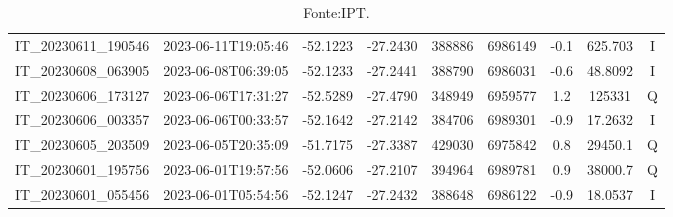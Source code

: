 \begin{table}[htb!]
\begin{center}
{\begin{tabular}{ccccS[table-format=6.0]S[table-format=7.0]ccc}
                IT\_20230611\_190546 & 2023-06-11T19:05:46 & -52.1223 & -27.2430 & 388886 & 6986149 & -0.1 & \num[round-precision=3,round-mode=figures,scientific-notation=true]{625.703} & I \\
                IT\_20230608\_063905 & 2023-06-08T06:39:05 & -52.1233 & -27.2441 & 388790 & 6986031 & -0.6 & \num[round-precision=3,round-mode=figures,scientific-notation=true]{48.8092} & I \\
                IT\_20230606\_173127 & 2023-06-06T17:31:27 & -52.5289 & -27.4790 & 348949 & 6959577 & 1.2 & \num[round-precision=3,round-mode=figures,scientific-notation=true]{125331} & Q \\
                IT\_20230606\_003357 & 2023-06-06T00:33:57 & -52.1642 & -27.2142 & 384706 & 6989301 & -0.9 & \num[round-precision=3,round-mode=figures,scientific-notation=true]{17.2632} & I \\
                IT\_20230605\_203509 & 2023-06-05T20:35:09 & -51.7175 & -27.3387 & 429030 & 6975842 & 0.8 & \num[round-precision=3,round-mode=figures,scientific-notation=true]{29450.1} & Q \\
                IT\_20230601\_195756 & 2023-06-01T19:57:56 & -52.0606 & -27.2107 & 394964 & 6989781 & 0.9 & \num[round-precision=3,round-mode=figures,scientific-notation=true]{38000.7} & Q \\
                IT\_20230601\_055456 & 2023-06-01T05:54:56 & -52.1247 & -27.2432 & 388648 & 6986122 & -0.9 & \num[round-precision=3,round-mode=figures,scientific-notation=true]{18.0537} & I \\
                \bottomrule
            \end{tabular}
        }
        \caption*{Fonte:IPT.}
    \end{center}
\end{table}
